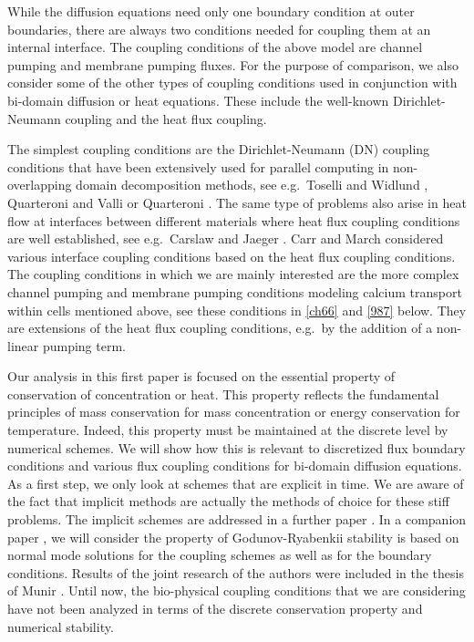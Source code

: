 
While the diffusion equations need only one boundary condition at outer boundaries,
there are always two conditions needed for coupling them at an internal interface. 
The coupling conditions of the above model are channel pumping and membrane pumping fluxes. 
For the purpose of comparison, we also consider some of the other types of coupling conditions used in conjunction with
bi-domain diffusion or heat equations.
These include the well-known Dirichlet-Neumann coupling and the heat flux coupling. 

The simplest coupling conditions are the Dirichlet-Neumann (DN) coupling conditions that
have been extensively used for parallel computing in non-overlapping domain decomposition methods, see e.g.\ 
Toselli and Widlund \cite{bTOWI}, Quarteroni and Valli \cite{bQUVA} or Quarteroni \cite[Ch.\ 19]{bQUA}.
The same type of problems also arise in heat flow at interfaces between different materials 
where heat flux coupling conditions are well
established, see e.g.\ Carslaw and Jaeger \cite{b8}. 
Carr and March \cite{l116} considered various interface coupling conditions based on the heat flux coupling conditions. 
The coupling conditions in which we are mainly interested are the more complex channel pumping and membrane
pumping conditions modeling calcium transport within cells mentioned above, 
see these conditions in \eqref{ch66} and \eqref{987} below. 
They are extensions of the heat flux coupling conditions, e.g.\ by the addition of a non-linear
pumping term. 
  
Our analysis in this first paper is focused on the essential property of conservation of concentration or heat.
This property reflects the fundamental principles of mass conservation for mass concentration or energy conservation
for temperature.
Indeed, this property must be maintained at the discrete level by numerical schemes. We will show
how this is relevant to discretized flux boundary conditions and various
flux coupling conditions for bi-domain diffusion equations. As a first step, we only look at schemes that
are explicit in time. We are aware of the fact that implicit methods are
actually the methods of choice for these stiff problems. The implicit schemes are addressed in a further paper \cite{CMW3}.
In a companion paper \cite{CMW2}, we will consider the property of 
Godunov-Ryabenkii stability is based on normal mode solutions for the coupling schemes as
well as for the boundary conditions. Results of the joint research of the authors 
were included in the thesis of Munir \cite{MUN}.
Until now, the bio-physical coupling conditions that we are considering
have not been analyzed in terms of the discrete conservation property and numerical stability.

